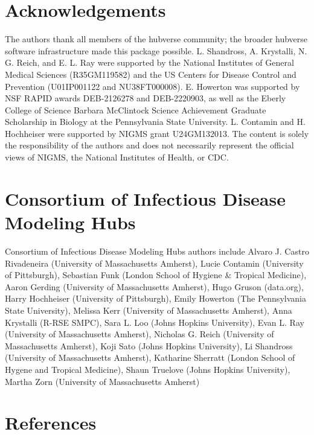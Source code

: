 \documentclass[
  letterpaper,
  DIV=11,
  numbers=noendperiod]{scrartcl}
\begin{document}
\section*{Acknowledgements}\label{acknowledgements}

The authors thank all members of the hubverse community; the broader
hubverse software infrastructure made this package possible. L.
Shandross, A. Krystalli, N. G. Reich, and E. L. Ray were supported by
the National Institutes of General Medical Sciences (R35GM119582) and
the US Centers for Disease Control and Prevention (U01IP001122 and
NU38FT000008). E. Howerton was supported by NSF RAPID awards DEB-2126278
and DEB-2220903, as well as the Eberly College of Science Barbara
McClintock Science Achievement Graduate Scholarship in Biology at the
Pennsylvania State University. L. Contamin and H. Hochheiser were
supported by NIGMS grant U24GM132013. The content is solely the
responsibility of the authors and does not necessarily represent the
official views of NIGMS, the National Institutes of Health, or CDC.

\section*{Consortium of Infectious Disease Modeling
Hubs}\label{consortium-of-infectious-disease-modeling-hubs}

Consortium of Infectious Disease Modeling Hubs authors include Alvaro J.
Castro Rivadeneira (University of Massachusetts Amherst), Lucie Contamin
(University of Pittsburgh), Sebastian Funk (London School of Hygiene \&
Tropical Medicine), Aaron Gerding (University of Massachusetts Amherst),
Hugo Gruson (data.org), Harry Hochheiser (University of Pittsburgh),
Emily Howerton (The Pennsylvania State University), Melissa Kerr
(University of Massachusetts Amherst), Anna Krystalli (R-RSE SMPC), Sara
L. Loo (Johns Hopkins University), Evan L. Ray (University of
Massachusetts Amherst), Nicholas G. Reich (University of Massachusetts
Amherst), Koji Sato (Johns Hopkins University), Li Shandross (University
of Massachusetts Amherst), Katharine Sherratt (London School of Hygene
and Tropical Medicine), Shaun Truelove (Johns Hopkins University),
Martha Zorn (University of Massachusetts Amherst)

\section*{References}\label{references}
\end{document}
